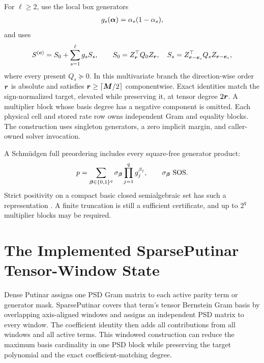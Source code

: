 For $\ell\ge2$, use the local box generators
\begin{gather*}
  g_s(\boldsymbol{\alpha})=\alpha_s(1-\alpha_s),
\end{gather*}
and  uses
\begin{gather*}
  S^{(\boldsymbol{c})}=S_0+\sum_{s=1}^{\ell}g_sS_s,
  \qquad
  S_0=Z_{\boldsymbol{r}}^\top Q_0
       Z_{\boldsymbol{r}},\quad
  S_s=Z_{\boldsymbol{r}-\boldsymbol{e}_s}^\top Q_s
       Z_{\boldsymbol{r}-\boldsymbol{e}_s},
\end{gather*}
where every present $Q_s\succeq0$. In this multivariate branch the direction-wise order $\boldsymbol{r}$ is absolute and satisfies $\boldsymbol{r}\ge\lceil\boldsymbol{M}/2\rceil$ componentwise. Exact identities match the sign-normalized target, elevated while preserving it, at tensor degree $2\boldsymbol{r}$. A multiplier block whose basis degree has a negative component is omitted. Each physical cell and stored rate row owns independent Gram and equality blocks. The construction uses singleton generators, a zero implicit margin, and caller-owned solver invocation.

A Schm\"udgen full preordering includes every square-free generator product:
\begin{gather*}
  p=\sum_{\boldsymbol{\beta}\in\{0,1\}^{q}}
  \sigma_{\boldsymbol{\beta}}\prod_{j=1}^{q}g_j^{\beta_j},
  \qquad \sigma_{\boldsymbol{\beta}}\text{ SOS}.
\end{gather*}
Strict positivity on a compact basic closed semialgebraic set has such a representation \cite{schmudgen1991}.  A finite truncation is still a sufficient certificate, and up to $2^q$ multiplier blocks may be required.

\section{The Implemented SparsePutinar Tensor-Window State}
\label{sec:certificate-sparse-putinar}

Dense Putinar assigns one PSD Gram matrix to each active parity term or generator mask. SparsePutinar covers that term's tensor Bernstein Gram basis by overlapping axis-aligned windows and assigns an independent PSD matrix to every window. The coefficient identity then adds all contributions from all windows and all active terms. This windowed construction can reduce the maximum basis cardinality in one PSD block while preserving the target polynomial and the exact coefficient-matching degree.


